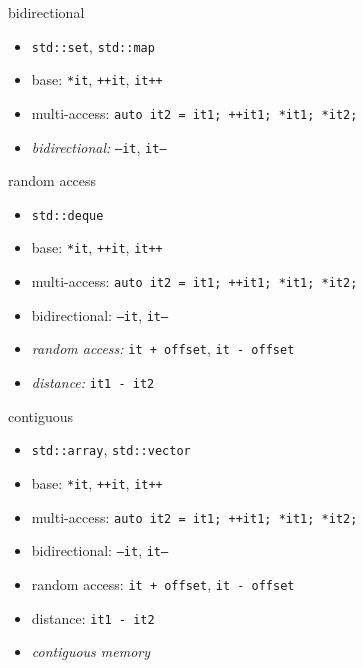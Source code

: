 \documentclass[aspectratio=169]{beamer}
\begin{document}
\begin{frame}[fragile]{bidirectional}
    \begin{itemize}
        \item \texttt{std::set}, \texttt{std::map}
    \end{itemize}
    \begin{itemize}
        \item base: \texttt{*it}, \texttt{++it}, \texttt{it++}
        \item multi-access: \texttt{auto it2 = it1; ++it1; *it1; *it2;}
        \item \emph{bidirectional:} \texttt{--it}, \texttt{it--}
    \end{itemize}
\end{frame}

\begin{frame}[fragile]{random access}
    \begin{itemize}
        \item \texttt{std::deque}
    \end{itemize}
    \begin{itemize}
        \item base: \texttt{*it}, \texttt{++it}, \texttt{it++}
        \item multi-access: \texttt{auto it2 = it1; ++it1; *it1; *it2;}
        \item bidirectional: \texttt{--it}, \texttt{it--}
        \item \emph{random access:} \texttt{it + offset}, \texttt{it - offset}
        \item \emph{distance:} \texttt{it1 - it2}
    \end{itemize}
\end{frame}

\begin{frame}[fragile]{contiguous}
\begin{itemize}
    \item \texttt{std::array}, \texttt{std::vector}
\end{itemize}
\begin{itemize}
    \item base: \texttt{*it}, \texttt{++it}, \texttt{it++}
    \item multi-access: \texttt{auto it2 = it1; ++it1; *it1; *it2;}
    \item bidirectional: \texttt{--it}, \texttt{it--}
    \item random access: \texttt{it + offset}, \texttt{it - offset}
    \item distance: \texttt{it1 - it2}
    \item \emph{contiguous memory}
\end{itemize}
\end{frame}
\end{document}
